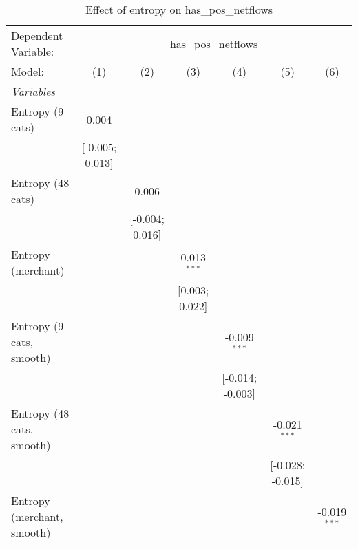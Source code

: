 
\begin{table}[htbp]
   \centering
   \tiny
   \begin{threeparttable}[b]
      \caption{\label{tab:reg_has_pos_netflows} Effect of entropy on has\_pos\_netflows}
      \begin{tabular}{lcccccc}
         \tabularnewline \midrule \midrule
         Dependent Variable: & \multicolumn{6}{c}{has\_pos\_netflows}\\
         Model:                     & (1)              & (2)              & (3)              & (4)              & (5)              & (6)\\  
         \midrule
         \emph{Variables}\\
         Entropy (9 cats)           & 0.004            &                  &                  &                  &                  &   \\   
                                    & [-0.005; 0.013]  &                  &                  &                  &                  &   \\   
         Entropy (48 cats)          &                  & 0.006            &                  &                  &                  &   \\   
                                    &                  & [-0.004; 0.016]  &                  &                  &                  &   \\   
         Entropy (merchant)         &                  &                  & 0.013$^{***}$    &                  &                  &   \\   
                                    &                  &                  & [0.003; 0.022]   &                  &                  &   \\   
         Entropy (9 cats, smooth)   &                  &                  &                  & -0.009$^{***}$   &                  &   \\   
                                    &                  &                  &                  & [-0.014; -0.003] &                  &   \\   
         Entropy (48 cats, smooth)  &                  &                  &                  &                  & -0.021$^{***}$   &   \\   
                                    &                  &                  &                  &                  & [-0.028; -0.015] &   \\   
         Entropy (merchant, smooth) &                  &                  &                  &                  &                  & -0.019$^{***}$\\   

\end{tabular}
\end{threeparttable}
\end{table}
